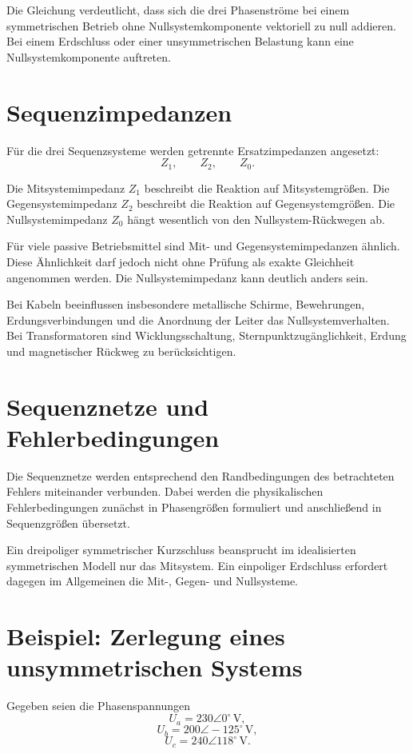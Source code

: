 Die Gleichung verdeutlicht, dass sich die drei Phasenströme bei einem
symmetrischen Betrieb ohne Nullsystemkomponente vektoriell zu null addieren.
Bei einem Erdschluss oder einer unsymmetrischen Belastung kann eine
Nullsystemkomponente auftreten.

\section{Sequenzimpedanzen}

Für die drei Sequenzsysteme werden getrennte Ersatzimpedanzen angesetzt:
\[
  Z_1,\qquad Z_2,\qquad Z_0.
\]

Die Mitsystemimpedanz \(Z_1\) beschreibt die Reaktion auf Mitsystemgrößen.
Die Gegensystemimpedanz \(Z_2\) beschreibt die Reaktion auf Gegensystemgrößen.
Die Nullsystemimpedanz \(Z_0\) hängt wesentlich von den Nullsystem-Rückwegen ab.

Für viele passive Betriebsmittel sind Mit- und Gegensystemimpedanzen ähnlich.
Diese Ähnlichkeit darf jedoch nicht ohne Prüfung als exakte Gleichheit
angenommen werden. Die Nullsystemimpedanz kann deutlich anders sein.

Bei Kabeln beeinflussen insbesondere metallische Schirme, Bewehrungen,
Erdungsverbindungen und die Anordnung der Leiter das Nullsystemverhalten.
Bei Transformatoren sind Wicklungsschaltung, Sternpunktzugänglichkeit,
Erdung und magnetischer Rückweg zu berücksichtigen.

\section{Sequenznetze und Fehlerbedingungen}

Die Sequenznetze werden entsprechend den Randbedingungen des betrachteten
Fehlers miteinander verbunden. Dabei werden die physikalischen
Fehlerbedingungen zunächst in Phasengrößen formuliert und anschließend
in Sequenzgrößen übersetzt.

Ein dreipoliger symmetrischer Kurzschluss beansprucht im idealisierten
symmetrischen Modell nur das Mitsystem. Ein einpoliger Erdschluss erfordert
dagegen im Allgemeinen die Mit-, Gegen- und Nullsysteme.

\section{Beispiel: Zerlegung eines unsymmetrischen Systems}

Gegeben seien die Phasenspannungen
\[
  U_a=230\angle 0^\circ\,\mathrm V,
\]
\[
  U_b=200\angle -125^\circ\,\mathrm V,
\]
\[
  U_c=240\angle 118^\circ\,\mathrm V.
\]

